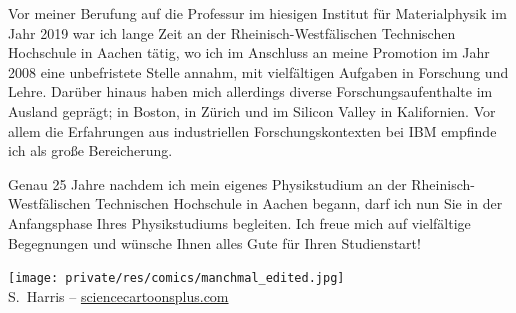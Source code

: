 \begin{multicols}{2}
Vor meiner Berufung auf die Professur im hiesigen Institut für Materialphysik im Jahr 2019 war ich lange Zeit an der Rheinisch-Westfälischen Technischen Hochschule in Aachen tätig, wo ich im Anschluss an meine Promotion im Jahr 2008 eine unbefristete Stelle annahm, mit vielfältigen Aufgaben in Forschung und Lehre. Darüber hinaus haben mich allerdings diverse Forschungsaufenthalte im Ausland geprägt; in Boston, in Zürich und im Silicon Valley in Kalifornien. Vor allem die Erfahrungen aus industriellen Forschungskontexten bei IBM empfinde ich als große Bereicherung. 
 
Genau 25 Jahre nachdem ich mein eigenes Physikstudium an der Rheinisch-Westfälischen Technischen Hochschule in Aachen begann, darf ich nun Sie in der Anfangsphase Ihres Physikstudiums begleiten. Ich freue mich auf vielfältige Begegnungen und wünsche Ihnen alles Gute für Ihren Studienstart!

\begin{center}
\texttt{[image: private/res/comics/manchmal\_edited.jpg]}\\
{\footnotesize 
S.~Harris – \url{sciencecartoonsplus.com}
}
\end{center}

\end{multicols}

\vfill

\newpage

